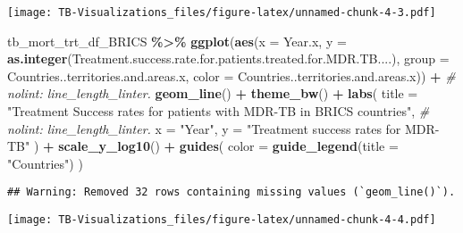 \documentclass[
]{article}
\newenvironment{Shaded}{\begin{snugshade}}{\end{snugshade}}
\newcommand{\AttributeTok}[1]{\textcolor[rgb]{0.13,0.29,0.53}{#1}}
\newcommand{\CommentTok}[1]{\textcolor[rgb]{0.56,0.35,0.01}{\textit{#1}}}
\newcommand{\FunctionTok}[1]{\textcolor[rgb]{0.13,0.29,0.53}{\textbf{#1}}}
\newcommand{\NormalTok}[1]{#1}
\newcommand{\SpecialCharTok}[1]{\textcolor[rgb]{0.81,0.36,0.00}{\textbf{#1}}}
\newcommand{\StringTok}[1]{\textcolor[rgb]{0.31,0.60,0.02}{#1}}
\begin{document}
\texttt{[image: TB-Visualizations\_files/figure-latex/unnamed-chunk-4-3.pdf]}

\begin{Shaded}
\begin{Highlighting}[]
\NormalTok{tb\_mort\_trt\_df\_BRICS }\SpecialCharTok{\%\textgreater{}\%}
  \FunctionTok{ggplot}\NormalTok{(}\FunctionTok{aes}\NormalTok{(}\AttributeTok{x =}\NormalTok{ Year.x, }\AttributeTok{y =} \FunctionTok{as.integer}\NormalTok{(Treatment.success.rate.for.patients.treated.for.MDR.TB....), }\AttributeTok{group =}\NormalTok{ Countries..territories.and.areas.x, }\AttributeTok{color =}\NormalTok{ Countries..territories.and.areas.x)) }\SpecialCharTok{+}  \CommentTok{\# nolint: line\_length\_linter.}
  \FunctionTok{geom\_line}\NormalTok{() }\SpecialCharTok{+}
  \FunctionTok{theme\_bw}\NormalTok{() }\SpecialCharTok{+}
  \FunctionTok{labs}\NormalTok{(}
    \AttributeTok{title =} \StringTok{"Treatment Success rates for patients with MDR{-}TB in BRICS countries"}\NormalTok{, }\CommentTok{\# nolint: line\_length\_linter.}
    \AttributeTok{x =} \StringTok{"Year"}\NormalTok{,}
    \AttributeTok{y =} \StringTok{"Treatment success rates for MDR{-}TB"}
\NormalTok{  ) }\SpecialCharTok{+}
  \FunctionTok{scale\_y\_log10}\NormalTok{() }\SpecialCharTok{+}
  \FunctionTok{guides}\NormalTok{(}
    \AttributeTok{color =} \FunctionTok{guide\_legend}\NormalTok{(}\AttributeTok{title =} \StringTok{"Countries"}\NormalTok{)}
\NormalTok{  )}
\end{Highlighting}
\end{Shaded}

\begin{verbatim}
## Warning: Removed 32 rows containing missing values (`geom_line()`).
\end{verbatim}

\texttt{[image: TB-Visualizations\_files/figure-latex/unnamed-chunk-4-4.pdf]}
\end{document}

